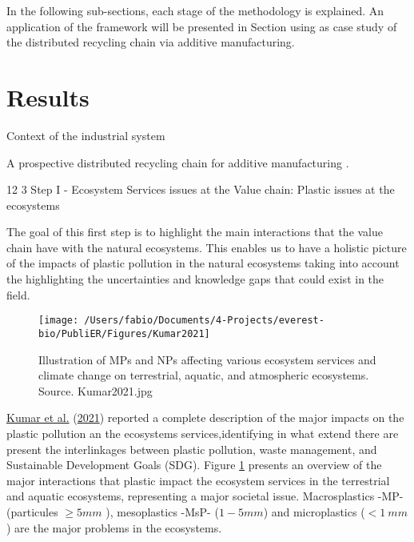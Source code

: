 \documentclass[]{elsarticle} %
\makeatletter
\renewcommand\subsection{\@startsection{subsection}{2}{\z@}%
         {12\p@ \@plus 6\p@ \@minus 3\p@}%
         {3\p@ \@plus 6\p@ \@minus 3\p@}%
         {\normalfont\normalsize\itshape\bfseries}}
\makeatother
\begin{document}
In the following sub-sections, each stage of the methodology is explained.
An application of the framework will be presented in Section \label{results} using as case study of the distributed recycling chain via additive manufacturing.

\hypertarget{results}{%
\section{Results}\label{results}}

\label{results}

Context of the industrial system

A prospective distributed recycling chain for additive manufacturing .

\hypertarget{step-i---ecosystem-services-issues-at-the-value-chain-plastic-issues-at-the-ecosystems}{%
\subsection{Step I - Ecosystem Services issues at the Value chain: Plastic issues at the ecosystems}\label{step-i---ecosystem-services-issues-at-the-value-chain-plastic-issues-at-the-ecosystems}}

The goal of this first step is to highlight the main interactions that the value chain have with the natural ecosystems.
This enables us to have a holistic picture of the impacts of plastic pollution in the natural ecosystems taking into account the highlighting the uncertainties and knowledge gaps that could exist in the field.

\begin{figure}

{\centering \texttt{[image: /Users/fabio/Documents/4-Projects/everest-bio/PubliER/Figures/Kumar2021]} 

}

\caption{Illustration of MPs and NPs affecting various ecosystem services and climate change on terrestrial, aquatic, and atmospheric ecosystems. Source. Kumar2021.jpg}\label{fig:fig-Kumar2021}
\end{figure}

\protect\hyperlink{ref-Kumar2021}{Kumar et al.} (\protect\hyperlink{ref-Kumar2021}{2021}) reported a complete description of the major impacts on the plastic pollution an the ecosystems services,identifying in what extend there are present the interlinkages between plastic pollution, waste management, and Sustainable Development Goals (SDG).
Figure \ref{fig:fig-Kumar2021} presents an overview of the major interactions that plastic impact the ecosystem services in the terrestrial and aquatic ecosystems, representing a major societal issue.
Macrosplastics -MP- (particules \(\geq 5mm\) ), mesoplastics -MsP- (\(1-5 mm\)) and microplastics (\(<1~mm\)) are the major problems in the ecosystems.
\end{document}
